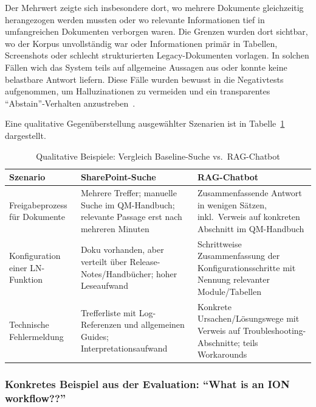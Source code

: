 Der Mehrwert zeigte sich insbesondere dort, wo mehrere Dokumente gleichzeitig herangezogen werden mussten oder wo relevante Informationen tief in umfangreichen Dokumenten verborgen waren.
Die Grenzen wurden dort sichtbar, wo der Korpus unvollständig war oder Informationen primär in Tabellen, Screenshots oder schlecht strukturierten Legacy-Dokumenten vorlagen.
In solchen Fällen wich das System teils auf allgemeine Aussagen aus oder konnte keine belastbare Antwort liefern.
Diese Fälle wurden bewusst in die Negativtests aufgenommen, um Halluzinationen zu vermeiden und ein transparentes \enquote{Abstain}-Verhalten anzustreben~\cite{ragas}.

Eine qualitative Gegenüberstellung ausgewählter Szenarien ist in Tabelle~\ref{tab:vergleich_sp_rag} dargestellt.
\vspace{1cm}
\FloatBarrier
\begin{table}[htbp]
    \centering
    \small
    \begin{tabular}{p{3.5cm}p{4.5cm}p{4.5cm}}
        \toprule
        \textbf{Szenario} & \textbf{SharePoint-Suche} & \textbf{RAG-Chatbot} \\
        \midrule
        Freigabeprozess für Dokumente &
        Mehrere Treffer; manuelle Suche im QM-Handbuch; relevante Passage erst nach mehreren Minuten &
        Zusammenfassende Antwort in wenigen Sätzen, inkl.\ Verweis auf konkreten Abschnitt im QM-Handbuch \\
        \addlinespace
        Konfiguration einer LN-Funktion &
        Doku vorhanden, aber verteilt über Release-Notes/Handbücher; hoher Leseaufwand &
        Schrittweise Zusammenfassung der Konfigurationsschritte mit Nennung relevanter Module/Tabellen \\
        \addlinespace
        Technische Fehlermeldung &
        Trefferliste mit Log-Referenzen und allgemeinen Guides; Interpretationsaufwand &
        Konkrete Ursachen/Lösungswege mit Verweis auf Troubleshooting-Abschnitte; teils Workarounds \\
        \bottomrule
    \end{tabular}
    \caption{Qualitative Beispiele: Vergleich Baseline-Suche vs.\ RAG-Chatbot}
    \label{tab:vergleich_sp_rag}
\end{table}
\vspace{1cm}
\FloatBarrier
\subsubsection{Konkretes Beispiel aus der Evaluation: \enquote{What is an ION workflow??}}\label{subsec:eval-ion-example}

